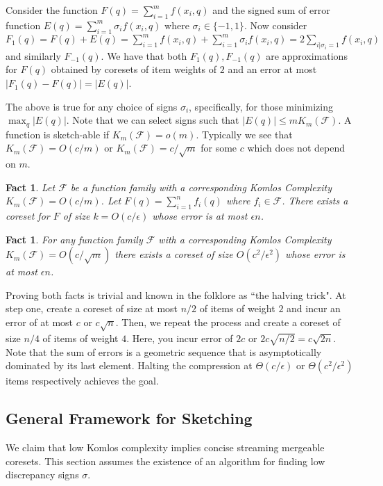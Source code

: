 \documentclass[anon,12pt]{colt2019} %
\newtheorem{fact}[theorem]{Fact}
\newcommand{\eps}{\epsilon}
\newcommand{\F}{\mathcal{F}}
\begin{document}
Consider the function $F(q) = \sum_{i=1}^{m} f(x_i,q)$ and the signed sum of error function $E(q) = \sum_{i=1}^{m} \sigma_i f(x_i,q)$ where $\sigma_i \in \{-1,1\}$.
Now consider $F_1(q) = F(q) + E(q) = \sum_{i=1}^{m} f(x_i,q)  + \sum_{i=1}^{m} \sigma_i f(x_i,q)  = 2 \sum_{i | \sigma_i=1} f(x_i,q)$ and similarly $F_{-1}(q)$. We have that both $F_1(q), F_{-1}(q)$ are approximations for $F(q)$ obtained by coresets of item weights of $2$ and an error at most $|F_1(q) - F(q)| =  |E(q)|$.

%
The above is true for any choice of signs $\sigma_i$, specifically, for those minimizing $\max_q | E(q)|$.
Note that we can select signs such that $|E(q)| \le m K_m(\F)$.
A function is sketch-able if $K_m(\F) = o(m)$.
Typically we see that $K_m(\F) = O(c/m)$ or $K_m(\F)= c/\sqrt{m}$ for some $c$ which does not depend on $m$.

\begin{fact}
Let $\F$ be a function family with a corresponding Komlos Complexity $K_m(\F) = O(c/m)$. Let $F(q) = \sum_{i=1}^{n}f_i(q)$ where $f_i \in \F$. There exists a coreset for $F$ of size $k = O(c/\eps)$ whose error is at most $\eps n$.
\end{fact}
\begin{fact}

For any function family $\F$ with a corresponding Komlos Complexity $K_m(\F) = O(c/\sqrt{m})$ there exists a coreset of size 
$O(c^2/\eps^2)$ whose error is at most $\eps n$.

\end{fact}

\noindent Proving both facts is trivial and known in the folklore as ``the halving trick". 
At step one, create a coreset of size at most $n/2$ of items of weight $2$ and incur an error of at most $c$ or $c \sqrt{n}$.
Then, we repeat the process and create a coreset of size $n/4$ of items of weight $4$. Here, you incur error of $2c$ or $2c\sqrt{n/2}  = c\sqrt{2n}$.
Note that the sum of errors is a geometric sequence that is asymptotically dominated by its last element. 
Halting the compression at $\Theta(c/\eps)$ or $\Theta(c^2/\eps^2)$ items respectively achieves the goal.



\subsection{General Framework for Sketching}\label{sec:sketch}
We claim that low Komlos complexity implies concise streaming mergeable coresets. 
This section assumes the existence of an algorithm for finding low discrepancy signs $\sigma$.
\end{document}
